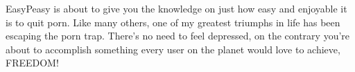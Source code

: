 \documentclass[easypeasy.tex]{subfiles}
\begin{document}
EasyPeasy is about to give you the knowledge on just how easy and enjoyable it is to quit porn. Like many others, one of my greatest triumphs in life has been escaping the porn trap. There's no need to feel depressed, on the contrary you're about to accomplish something every user on the planet would love to achieve, FREEDOM!
\end{document}
